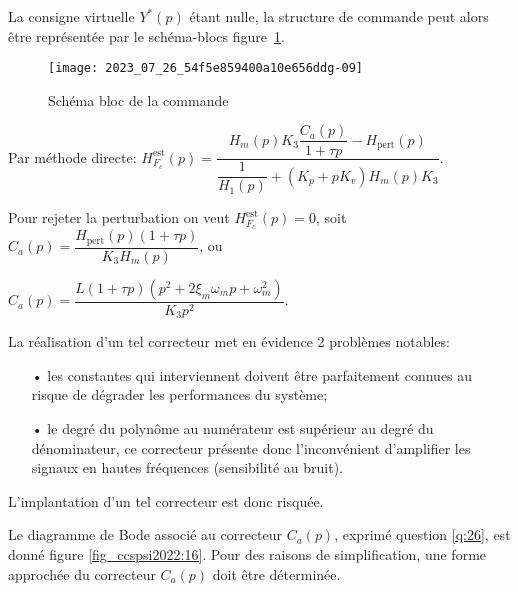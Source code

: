 La consigne virtuelle $Y^{*}(p)$ étant nulle, la structure de commande peut alors être représentée par le schéma-blocs figure~\ref{fig_ccspsi2022:15}.

\begin{figure}[!h]
\centering
\texttt{[image: 2023\_07\_26\_54f5e859400a10e656ddg-09]}
\caption{\label{fig_ccspsi2022:15}Schéma bloc de la commande}
\end{figure}
\fi

\ifprof
\begin{corrige}
Par méthode directe:
$ \boxed{H_{F_c}^{\text{est}}(p) = \dfrac{H_m(p) K_3 \dfrac{C_a(p)}{1+\tau p} - H_{\text{pert}}(p)}{\dfrac{1}{H_1(p)} + (K_p + p K_v)H_m(p) K_3}} $.
\end{corrige}
\else
\fi

\ifprof
\begin{corrige}
Pour rejeter la perturbation on veut $H_{F_c}^{\text{est}}(p) = 0$, soit $\boxed{C_a(p) = \dfrac{H_{\text{pert}}(p)(1+\tau p)}{K_3 H_m(p)}}$, ou 

$\boxed{C_a(p) = \dfrac{L(1+\tau p)(p^2 + 2\xi_m \omega_m p + \omega_m^2)}{K_3 p^2}}$.
\end{corrige}
\else
\fi

\ifprof
\begin{corrige}
La réalisation d'un tel correcteur met en évidence 2 problèmes notables:
\begin{itemize}
\item[•] les constantes qui interviennent doivent être parfaitement connues au risque de dégrader les performances du système;
\item[•] le degré du polynôme au numérateur est supérieur au degré du dénominateur, ce correcteur présente donc l'inconvénient d'amplifier les signaux en hautes fréquences (sensibilité au bruit).
\end{itemize}

L'implantation d'un tel correcteur est donc risquée.
\end{corrige}
\else
\fi
\ifprof
\else
Le diagramme de Bode associé au correcteur $C_{a}(p)$, exprimé question \ref{q:26}, est donné figure \ref{fig_ccspsi2022:16}. Pour des raisons de simplification, une forme approchée du correcteur $C_{a}(p)$ doit être déterminée.
\fi


